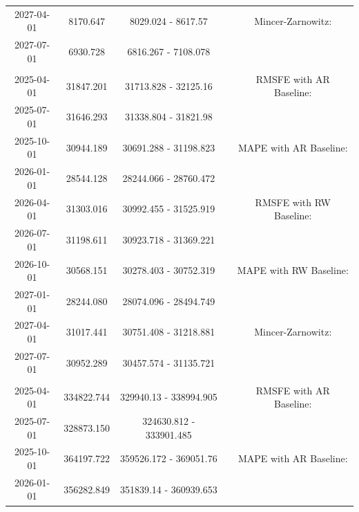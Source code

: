 \begin{table}
\begin{tabular}[t]{ccccc}
\hspace{1em}2027-04-01 & 8170.647 & 8029.024 - 8617.57 &  & Mincer-Zarnowitz:\\
\hspace{1em}2027-07-01 & 6930.728 & 6816.267 - 7108.078 &  & \\
\addlinespace[0.3em]
\multicolumn{5}{l}{\textbf{EmiCO2RoaTra}}\\
\hspace{1em}2025-04-01 & 31847.201 & 31713.828 - 32125.16 &  & RMSFE with AR Baseline:\\
\hspace{1em}2025-07-01 & 31646.293 & 31338.804 - 31821.98 &  & \\
\hspace{1em}2025-10-01 & 30944.189 & 30691.288 - 31198.823 &  & MAPE with AR Baseline:\\
\hspace{1em}2026-01-01 & 28544.128 & 28244.066 - 28760.472 &  & \\
\hspace{1em}2026-04-01 & 31303.016 & 30992.455 - 31525.919 &  & RMSFE with RW Baseline:\\
\hspace{1em}2026-07-01 & 31198.611 & 30923.718 - 31369.221 &  & \\
\hspace{1em}2026-10-01 & 30568.151 & 30278.403 - 30752.319 &  & MAPE with RW Baseline:\\
\hspace{1em}2027-01-01 & 28244.080 & 28074.096 - 28494.749 &  & \\
\hspace{1em}2027-04-01 & 31017.441 & 30751.408 - 31218.881 &  & Mincer-Zarnowitz:\\
\hspace{1em}2027-07-01 & 30952.289 & 30457.574 - 31135.721 &  & \\
\addlinespace[0.3em]
\multicolumn{5}{l}{\textbf{RealConsHH}}\\
\hspace{1em}2025-04-01 & 334822.744 & 329940.13 - 338994.905 &  & RMSFE with AR Baseline:\\
\hspace{1em}2025-07-01 & 328873.150 & 324630.812 - 333901.485 &  & \\
\hspace{1em}2025-10-01 & 364197.722 & 359526.172 - 369051.76 &  & MAPE with AR Baseline:\\
\hspace{1em}2026-01-01 & 356282.849 & 351839.14 - 360939.653 &  & \\

\end{tabular}
\end{table}
